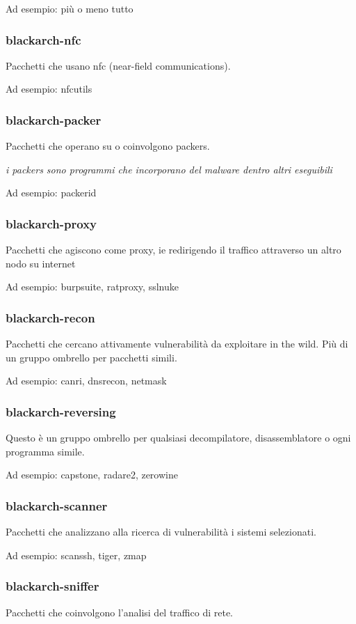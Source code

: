 \documentclass[a4paper, oneside, 11pt]{book}
\begin{document}
Ad esempio: più o meno tutto

\subsubsection{blackarch-nfc}
Pacchetti che usano nfc (near-field communications).

Ad esempio: nfcutils

\subsubsection{blackarch-packer}
Pacchetti che operano su o coinvolgono packers.

\textit{i packers sono programmi che incorporano del malware dentro altri eseguibili}

Ad esempio: packerid

\subsubsection{blackarch-proxy}
Pacchetti che agiscono come proxy, ie redirigendo il traffico attraverso un altro nodo su internet

Ad esempio: burpsuite, ratproxy, sslnuke

\subsubsection{blackarch-recon}
Pacchetti che cercano attivamente vulnerabilità da exploitare in the wild. Più di un gruppo ombrello per pacchetti simili.

Ad esempio: canri, dnsrecon, netmask

\subsubsection{blackarch-reversing}
Questo è un gruppo ombrello per qualsiasi decompilatore, disassemblatore o ogni programma simile.

Ad esempio: capstone, radare2, zerowine

\subsubsection{blackarch-scanner}
Pacchetti che analizzano alla ricerca di vulnerabilità i sistemi selezionati.

Ad esempio: scanssh, tiger, zmap

\subsubsection{blackarch-sniffer}
Pacchetti che coinvolgono l'analisi del traffico di rete.
\end{document}
